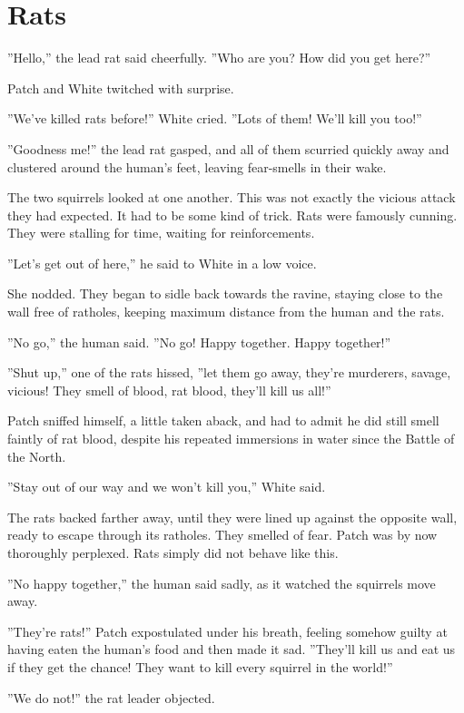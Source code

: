 \documentclass[12pt]{book}
\begin{document}

\section{Rats}

''Hello,'' the lead rat said cheerfully. ''Who are you? How did you
get here?''

Patch and White twitched with surprise.

''We've killed rats before!'' White cried. ''Lots of them! We'll kill
you too!''

''Goodness me!'' the lead rat gasped, and all of them scurried quickly
away and clustered around the human's feet, leaving fear-smells in
their wake.

The two squirrels looked at one another. This was not exactly the
vicious attack they had expected. It had to be some kind of
trick. Rats were famously cunning. They were stalling for time,
waiting for reinforcements.

''Let's get out of here,'' he said to White in a low voice.

She nodded. They began to sidle back towards the ravine, staying close
to the wall free of ratholes, keeping maximum distance from the human
and the rats.

''No go,'' the human said. ''No go! Happy together. Happy together!''

''Shut up,'' one of the rats hissed, ''let them go away, they're
murderers, savage, vicious! They smell of blood, rat blood, they'll
kill us all!''

Patch sniffed himself, a little taken aback, and had to admit he did
still smell faintly of rat blood, despite his repeated immersions in
water since the Battle of the North.

''Stay out of our way and we won't kill you,'' White said.

The rats backed farther away, until they were lined up against the
opposite wall, ready to escape through its ratholes. They smelled of
fear. Patch was by now thoroughly perplexed. Rats simply did not
behave like this.

''No happy together,'' the human said sadly, as it watched the
squirrels move away.

''They're rats!'' Patch expostulated under his breath, feeling somehow
guilty at having eaten the human's food and then made it
sad. ''They'll kill us and eat us if they get the chance! They want to
kill every squirrel in the world!''

''We do not!'' the rat leader objected.
\end{document}
